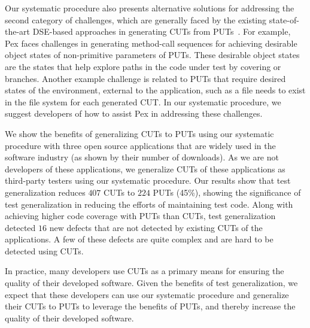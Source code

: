 Our systematic procedure also presents alternative solutions for addressing the second category of challenges, which are generally faced by the existing state-of-the-art DSE-based approaches in generating CUTs from PUTs~\cite{}. For example, Pex faces challenges in generating method-call sequences for achieving desirable object states of non-primitive parameters of PUTs. These desirable object states are the states that help explore paths in the code under test by covering  or  branches. Another example challenge is related to PUTs that require desired states of the environment, external to the application, such as a file needs to exist in the file system for each
generated CUT. In our systematic procedure, we suggest developers of how to assist Pex in addressing these challenges.

We show the benefits of generalizing CUTs to PUTs using our systematic procedure with three open source applications that are widely used in the software industry (as shown by their number of downloads). As we are not developers of these applications, we generalize CUTs of these applications as third-party testers using our systematic procedure. Our results show that test generalization reduces $407$ CUTs to $224$ PUTs (45\%), showing the significance of test generalization in reducing the efforts of maintaining test code. 
Along with achieving higher code coverage with PUTs than CUTs, test generalization detected $16$ new defects that are not detected by existing CUTs of the applications. A few of these defects are quite complex and are hard to be detected using CUTs. 

In practice, many developers use CUTs as a primary means for ensuring the quality of their developed software. Given the benefits of test generalization, we expect that these developers can use our systematic procedure and generalize their CUTs to PUTs to leverage the benefits of PUTs, and thereby increase the quality of their developed software.

